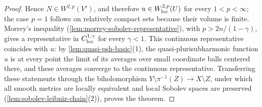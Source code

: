 \begin{proof}
Hence $N\in W^{2,p}(V')$, and therefore $u\in W^{2,p}_{\mathrm{loc}}(U)$ for every $1<p<\infty$; the case $p=1$ follows on relatively compact sets because their volume is finite. Morrey's inequality (\cref{lem:morrey-sobolev-representative}), with $p>2n/(1-\gamma)$, gives a representative in $C^{1,\gamma}_{\mathrm{loc}}$ for every $\gamma<1$. This continuous representative coincides with $u$: by \cref{lem:quasi-psh-basic}(1), the quasi-plurisubharmonic function $u$ is at every point the limit of its averages over small coordinate balls centered there, and these averages converge to the continuous representative. Transferring these statements through the biholomorphism $Y\setminus\pi^{-1}(Z)\to X\setminus Z$, under which all smooth metrics are locally equivalent and local Sobolev spaces are preserved (\cref{lem:sobolev-leibniz-chain}(2)), proves the theorem.
\end{proof}
